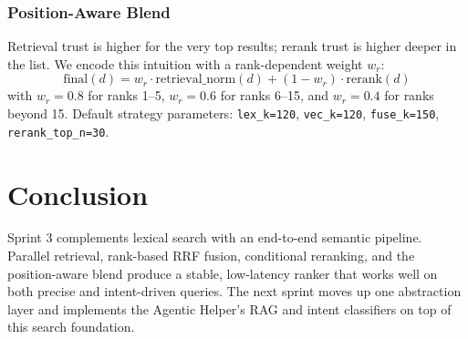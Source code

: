 \subsubsection{Position-Aware Blend}

Retrieval trust is higher for the very top results; rerank trust is higher deeper in the list.
We encode this intuition with a rank-dependent weight $w_r$:
\begin{equation}
\mathrm{final}(d)=w_r \cdot \mathrm{retrieval\_norm}(d) + (1-w_r)\cdot \mathrm{rerank}(d)
\label{eq:blend}
\end{equation}
with $w_r=0.8$ for ranks 1--5, $w_r=0.6$ for ranks 6--15, and $w_r=0.4$ for ranks beyond 15.
Default strategy parameters: \texttt{lex\_k=120}, \texttt{vec\_k=120}, \texttt{fuse\_k=150},
\texttt{rerank\_top\_n=30}.

\section*{Conclusion}

Sprint 3 complements lexical search with an end-to-end semantic pipeline. Parallel retrieval,
rank-based RRF fusion, conditional reranking, and the position-aware blend produce a stable,
low-latency ranker that works well on both precise and intent-driven queries. The next sprint
moves up one abstraction layer and implements the Agentic Helper's RAG and intent classifiers on
top of this search foundation.
